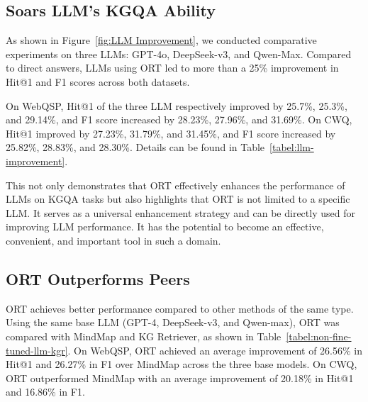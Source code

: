 \subsection{Soars LLM's KGQA Ability}

As shown in Figure~\ref{fig:LLM Improvement}, we conducted comparative experiments on three LLMs: GPT-4o, DeepSeek-v3, and Qwen-Max. Compared to direct answers, LLMs using ORT led to more than a 25\% improvement in Hit@1 and F1 scores across both datasets. 

On WebQSP, Hit@1 of the three LLM respectively improved by 25.7\%, 25.3\%, and 29.14\%, and F1 score increased by 28.23\%, 27.96\%, and 31.69\%. On CWQ, Hit@1 improved by 27.23\%, 31.79\%, and 31.45\%, and F1 score increased by 25.82\%, 28.83\%, and 28.30\%. Details can be found in Table~\ref{tabel:llm-improvement}.

This not only demonstrates that ORT effectively enhances the performance of LLMs on KGQA tasks but also highlights that ORT is not limited to a specific LLM. It serves as a universal enhancement strategy and can be directly used for improving LLM performance. It has the potential to become an effective, convenient, and important tool in such a domain.



\subsection{ORT Outperforms Peers}




ORT achieves better performance compared to other methods of the same type. Using the same base LLM (GPT-4, DeepSeek-v3, and Qwen-max), ORT was compared with MindMap and KG Retriever, as shown in Table~\ref{tabel:non-fine-tuned-llm-kgr}. On WebQSP, ORT achieved an average improvement of 26.56\% in Hit@1 and 26.27\% in F1 over MindMap across the three base models. On CWQ, ORT outperformed MindMap with an average improvement of 20.18\% in Hit@1 and 16.86\% in F1. 

